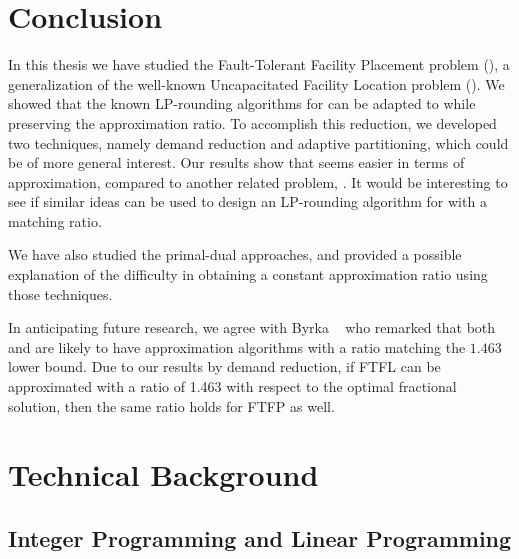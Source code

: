 \documentclass[oneside,final]{ucr}
\begin{document}
\chapter{Conclusion} \label{ch: conclusion} 

In this thesis we have studied the Fault-Tolerant Facility
Placement problem ({\FTFP}), a generalization of the
well-known Uncapacitated Facility Location problem
({\UFL}). We showed that the known LP-rounding algorithms
for {\UFL} can be adapted to {\FTFP} while preserving the
approximation ratio. To accomplish this reduction, we
developed two techniques, namely demand reduction and
adaptive partitioning, which could be of more general
interest. Our results show that {\FTFP} seems easier in
terms of approximation, compared to another related problem,
{\FTFL}. It would be interesting to see if similar ideas can
be used to design an LP-rounding algorithm for {\FTFL} with
a matching ratio.

We have also studied the primal-dual approaches, and
provided a possible explanation of the difficulty in
obtaining a constant approximation ratio using those
techniques.

In anticipating future research, we agree with Byrka
{\etal}~\cite{ByrkaSS10} who remarked that both {\UFL} and
{\FTFL} are likely to have approximation algorithms with a
ratio matching the $1.463$ lower bound. Due to our results
by demand reduction, if FTFL can be approximated with a
ratio of 1.463 with respect to the optimal fractional
solution, then the same ratio holds for FTFP as well.




\appendix
\chapter{Technical Background}

\section{Integer Programming and Linear Programming}
\label{sec: ILP}
\end{document}
